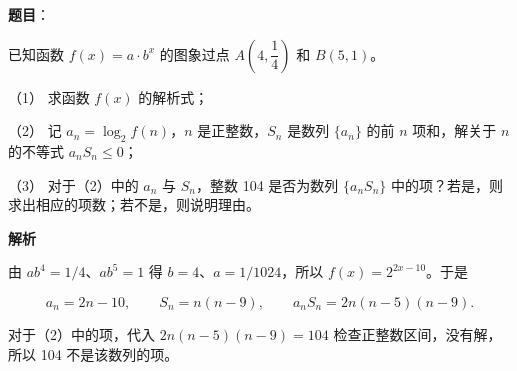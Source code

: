 \begin{answer}

\textbf{题目}：

已知函数 $f(x)=a\cdot b^x$ 的图象过点 $A(4,\dfrac14)$ 和 $B(5,1)$。

（1） 求函数 $f(x)$ 的解析式；

（2） 记 $a_n=\log_2f(n)$，$n$ 是正整数，$S_n$ 是数列 $\{a_n\}$ 的前 $n$ 项和，解关于 $n$ 的不等式 $a_nS_n\le0$；

（3） 对于（2）中的 $a_n$ 与 $S_n$，整数 104 是否为数列 $\{a_nS_n\}$ 中的项？若是，则求出相应的项数；若不是，则说明理由。

\textbf{解析}


由 $ab^4=1/4$、$ab^5=1$ 得 $b=4$、$a=1/1024$，所以 $f(x)=2^{2x-10}$。于是

\nopagebreak[4]
\[
a_n=2n-10,\qquad S_n=n(n-9),\qquad
a_nS_n=2n(n-5)(n-9).
\]



对于（2）中的项，代入 $2n(n-5)(n-9)=104$ 检查正整数区间，没有解，所以 104 不是该数列的项。




\end{answer}

